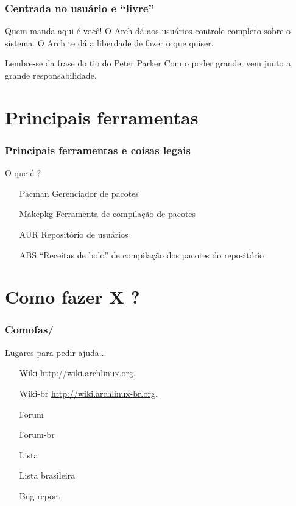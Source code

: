 \documentclass{beamer}
\begin{document}
\begin{frame}
    \frametitle{Centrada no usuário e ``livre''}
    \begin{block}{Quem manda aqui é você!}
        O Arch dá aos usuários controle completo sobre o sistema. O Arch te dá a liberdade de fazer o que quiser.
    \end{block}
    \begin{block}{Lembre-se da frase do tio do Peter Parker}
        Com o poder grande, vem junto a grande responsabilidade.
    \end{block}
\end{frame}



\section{Principais ferramentas}

\begin{frame}[fragile]
        \frametitle{Principais ferramentas e coisas legais}
        \begin{block}{O que é ?}
            \begin{itemize}
                \centering
                \item[Pacman] Gerenciador de pacotes 
                \item[Makepkg] Ferramenta de compilação de pacotes
                \item[AUR] Repositório de usuários
                \item[ABS] ``Receitas de bolo'' de compilação dos pacotes do repositório
            \end{itemize}
        \end{block}
\end{frame}

\section{Como fazer X ? }

\begin{frame}
    \frametitle{Comofas/}
    \begin{block}{Lugares para pedir ajuda...}
        \begin{itemize}
            \centering
            \item[Wiki] \url{http://wiki.archlinux.org}. 
            \item[Wiki-br] \url{http://wiki.archlinux-br.org}. 
            \item[Forum] %
            \item[Forum-br] %
            \item[Lista] %
            \item[Lista brasileira] %
            \item[Bug report] %
        \end{itemize}
    \end{block}        

\end{frame}
\end{document}
